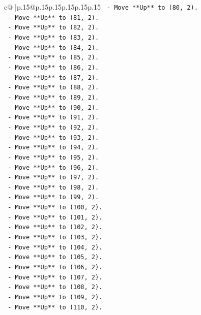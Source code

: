 \documentclass{article}
\begin{document}
{\begin{supertabular}{c@{$\;$}|p{.15\linewidth}@{}p{.15\linewidth}p{.15\linewidth}p{.15\linewidth}p{.15\linewidth}p{.15\linewidth}}
{{{\texttt{    {-} Move **Up** to (80, 2).} \\
\texttt{    {-} Move **Up** to (81, 2).} \\
\texttt{    {-} Move **Up** to (82, 2).} \\
\texttt{    {-} Move **Up** to (83, 2).} \\
\texttt{    {-} Move **Up** to (84, 2).} \\
\texttt{    {-} Move **Up** to (85, 2).} \\
\texttt{    {-} Move **Up** to (86, 2).} \\
\texttt{    {-} Move **Up** to (87, 2).} \\
\texttt{    {-} Move **Up** to (88, 2).} \\
\texttt{    {-} Move **Up** to (89, 2).} \\
\texttt{    {-} Move **Up** to (90, 2).} \\
\texttt{    {-} Move **Up** to (91, 2).} \\
\texttt{    {-} Move **Up** to (92, 2).} \\
\texttt{    {-} Move **Up** to (93, 2).} \\
\texttt{    {-} Move **Up** to (94, 2).} \\
\texttt{    {-} Move **Up** to (95, 2).} \\
\texttt{    {-} Move **Up** to (96, 2).} \\
\texttt{    {-} Move **Up** to (97, 2).} \\
\texttt{    {-} Move **Up** to (98, 2).} \\
\texttt{    {-} Move **Up** to (99, 2).} \\
\texttt{    {-} Move **Up** to (100, 2).} \\
\texttt{    {-} Move **Up** to (101, 2).} \\
\texttt{    {-} Move **Up** to (102, 2).} \\
\texttt{    {-} Move **Up** to (103, 2).} \\
\texttt{    {-} Move **Up** to (104, 2).} \\
\texttt{    {-} Move **Up** to (105, 2).} \\
\texttt{    {-} Move **Up** to (106, 2).} \\
\texttt{    {-} Move **Up** to (107, 2).} \\
\texttt{    {-} Move **Up** to (108, 2).} \\
\texttt{    {-} Move **Up** to (109, 2).} \\
\texttt{    {-} Move **Up** to (110, 2).} \\
}}}
\end{supertabular}}
\end{document}
